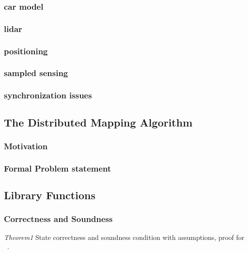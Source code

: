 \subsubsection{car model}
\subsubsection{lidar}
\subsubsection{positioning}
\subsubsection{sampled sensing}
\subsubsection{synchronization issues}
 
\subsection{The Distributed Mapping Algorithm}
\subsubsection{Motivation}


\subsubsection{Formal Problem statement}
\subsection{Library Functions}


\subsubsection{Correctness and Soundness}
\emph{Theorem1} State correctness and soundness condition with assumptions, proof for ~. 

